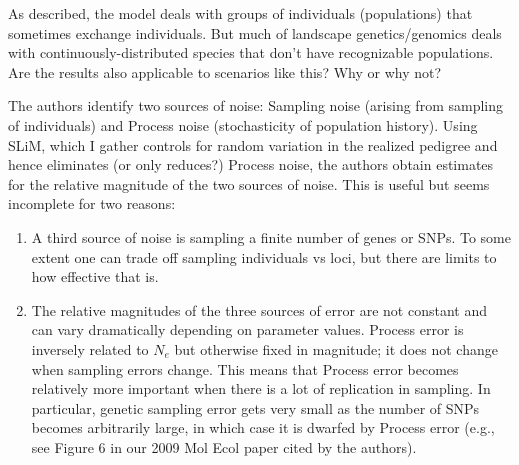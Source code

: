 
\begin{point}{}
    As described, the model deals with groups of individuals (populations) that
    sometimes exchange individuals.  But much of landscape genetics/genomics
    deals with continuously-distributed species that don’t have recognizable
    populations.  Are the results also applicable to scenarios like this?  Why
    or why not?
\end{point}


\begin{point}{}
    The authors identify two sources of noise: Sampling noise (arising from
    sampling of individuals) and Process noise (stochasticity of population
    history).  Using SLiM, which I gather controls for random variation in the
    realized pedigree and hence eliminates (or only reduces?) Process noise,
    the authors obtain estimates for the relative magnitude of the two sources
    of noise.  This is useful but seems incomplete for two reasons:
    \begin{enumerate}
        \item       A third source of noise is sampling a finite number of
            genes or SNPs.  To some extent one can trade off sampling
            individuals vs loci, but there are limits to how effective that is.
        \item       The relative magnitudes of the three sources of error are
            not constant and can vary dramatically depending on parameter
            values.  Process error is inversely related to $N_e$ but otherwise
            fixed in magnitude; it does not change when sampling errors change.
            This means that Process error becomes relatively more important
            when there is a lot of replication in sampling.  In particular,
            genetic sampling error gets very small as the number of SNPs
            becomes arbitrarily large, in which case it is dwarfed by Process
            error (e.g., see Figure 6 in our 2009 Mol Ecol paper cited by the
            authors).
    \end{enumerate}
\end{point}

